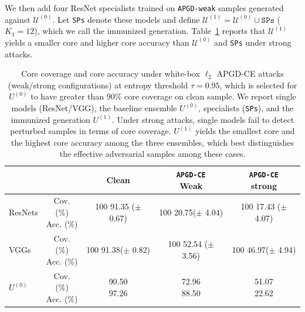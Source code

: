 \documentclass{article}
\theoremstyle{plain}
\theoremstyle{definition}
\theoremstyle{remark}
\newcommand{\cU}{\mathcal{U}}
\begin{document}
We then add four ResNet specialists trained on \texttt{APGD-weak} samples generated against $\cU^{(0)}$.
Let \texttt{SPs} denote these models and define $\cU^{(1)}=\cU^{(0)}\cup\texttt{SPs}$ ($K_1=12$), which we call the immunized generation.
Table~\ref{tab:entropy_failure} reports that $\cU^{(1)}$ yields a smaller core and higher core accuracy than $\cU^{(0)}$ and \texttt{SPs} under strong attacks.

\begin{table}[t]
	\centering
		\vspace{0.1in}
	\caption{Core coverage and core accuracy under white-box $\ell_2$ APGD-CE attacks (weak/strong configurations) at entropy threshold $\tau=0.95$, which is selected for $U^{(0)}$ to have greater than $90\%$ core coverage on clean sample.
		We report single models (ResNet/VGG), the baseline ensemble $U^{(0)}$, specialists (\texttt{SPs}), and the immunized generation $U^{(1)}$.
		Under strong attacks, single models fail to detect perturbed samples in terms of core coverage. $U^{(1)}$ yields the smallest core and the highest core accuracy among the three ensembles, which best distinguishes the effective adversarial samples among these cases.}
	\label{tab:entropy_failure}
		\vspace{0.1in}
	\setlength{\tabcolsep}{6pt}

	{\scriptsize
		\begin{tabular}{lcccc}
			\toprule
			& &Clean & \makecell{ \texttt{APGD-CE} \\Weak}& \makecell{ \texttt{APGD-CE} \\ strong}\\
			\midrule
			ResNets &\makecell{Cov. (\%) \\ Acc. (\%)}&
			\makecell[c]{ 100  \\  91.35 ($\pm$ 0.67)} &
			\makecell[c]{ 100\\  20.75($\pm$ 4.04)} &
			\makecell[c]{ 100  \\  17.43  ($\pm$ 4.07)} \\
			
			VGGs &\makecell{Cov. (\%) \\ Acc. (\%)}&
			\makecell[c]{ 100\\  91.38($\pm$ 0.82)} &
			\makecell[c]{ 100\\  52.54  ($\pm$ 3.56)} &
			\makecell[c]{100 \\ 46.97($\pm$ 4.94)} \\
			
			$U^{(0)}$&\makecell{Cov. (\%) \\ Acc. (\%)}&
			\makecell[c]{90.50\\ 97.26} &
			\makecell[c]{72.96\\ 88.50 } &
			\makecell[c]{51.07 \\ 22.62 } \\
			

\end{tabular}}
\end{table}
\end{document}

